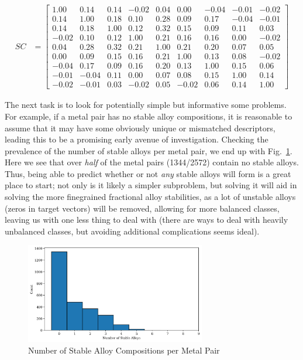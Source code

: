 \documentclass[11pt]{article}
\begin{document}
\begin{align}
\label{eq:stab_corr}
SC &= \begin{bmatrix}
1.00 & 0.14 & 0.14 & -0.02 & 0.04 & 0.00 & -0.04 & -0.01 & -0.02 \\
0.14 & 1.00 & 0.18 & 0.10 & 0.28 & 0.09 & 0.17 & -0.04 & -0.01 \\
0.14 & 0.18 & 1.00 & 0.12 & 0.32 & 0.15 & 0.09 & 0.11 & 0.03 \\
-0.02 & 0.10 & 0.12 & 1.00 & 0.21 & 0.16 & 0.16 & 0.00 & -0.02 \\
0.04 & 0.28 & 0.32 & 0.21 & 1.00 & 0.21 & 0.20 & 0.07 & 0.05 \\
0.00 & 0.09 & 0.15 & 0.16 & 0.21 & 1.00 & 0.13 & 0.08 & -0.02 \\
-0.04 & 0.17 & 0.09 & 0.16 & 0.20 & 0.13 & 1.00 & 0.15 & 0.06 \\
-0.01 & -0.04 & 0.11 & 0.00 & 0.07 & 0.08 & 0.15 & 1.00 & 0.14 \\
-0.02 & -0.01 & 0.03 & -0.02 & 0.05 & -0.02 & 0.06 & 0.14 & 1.00
\end{bmatrix}
\end{align}

\noindent The next task is to look for potentially simple but informative some problems. For example, if a metal pair has no stable alloy compositions, it is reasonable to assume that it may have some obviously unique or mismatched descriptors, leading this to be a promising early avenue of investigation. Checking the prevalence of the number of stable alloys per metal pair, we end up with Fig.~\ref{alloy_comp_bar}. Here we see that over \emph{half} of the metal pairs (1344/2572) contain no stable alloys. Thus, being able to predict whether or not \emph{any} stable alloys will form is a great place to start; not only is it likely a simpler subproblem, but solving it will aid in solving the more finegrained fractional alloy stabilities, as a lot of unstable alloys (zeros in target vectors) will be removed, allowing for more balanced classes, leaving us with one less thing to deal with (there are ways to deal with heavily unbalanced classes, but avoiding additional complications seems ideal). 

\begin{figure}[H]
\centering
\includegraphics[width=0.7\textwidth]{stable_suballoys_hist.png}
\caption{Number of Stable Alloy Compositions per Metal Pair}
\label{alloy_comp_bar}
\end{figure}
\end{document}
